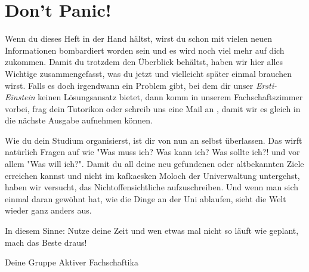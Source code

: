 %
%

\section{Don't Panic!}

Wenn du dieses Heft in der Hand hältst, wirst du schon mit vielen neuen Informationen bombardiert worden sein und es wird noch viel mehr auf dich zukommen. Damit du trotzdem den Überblick behältst, haben wir hier alles Wichtige zusammengefasst, was du jetzt und vielleicht später einmal brauchen wirst. Falls es doch irgendwann ein Problem gibt, bei dem dir unser \emph{Ersti-Einstein} keinen Lösungsansatz bietet, dann komm in unserem Fachschaftszimmer vorbei, frag dein Tutorikon oder schreib uns eine Mail an , damit wir es gleich in die nächste Ausgabe aufnehmen können.

Wie du dein Studium organisierst, ist dir von nun an selbst überlassen. Das wirft natürlich Fragen auf wie "Was muss ich? Was kann ich? Was sollte ich?! und vor allem "Was will ich?". Damit du all deine neu gefundenen oder altbekannten Ziele erreichen kannst und nicht im kafkaesken Moloch der Univerwaltung untergehst, haben wir versucht, das Nichtoffensichtliche aufzuschreiben. Und wenn man sich einmal daran gewöhnt hat, wie die Dinge an der Uni ablaufen, sieht die Welt wieder ganz anders aus.

In diesem Sinne: Nutze deine Zeit und wen etwas mal nicht so läuft wie geplant, mach das Beste draus!

Deine Gruppe Aktiver Fachschaftika
